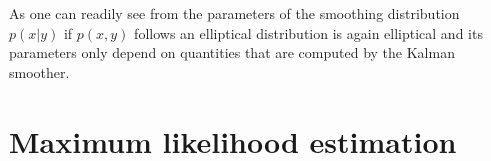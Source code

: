 \begin{theorem}
    \label{thm:elliptical-conditional}
\end{theorem}

As one can readily see from  the parameters of the smoothing distribution $p(x|y)$ if $p(x,y)$ follows an elliptical distribution is again elliptical and its parameters only depend on quantities that are computed by the Kalman smoother. 



\section{Maximum likelihood estimation}
\label{sec:maximum_likelihood_estimation}



